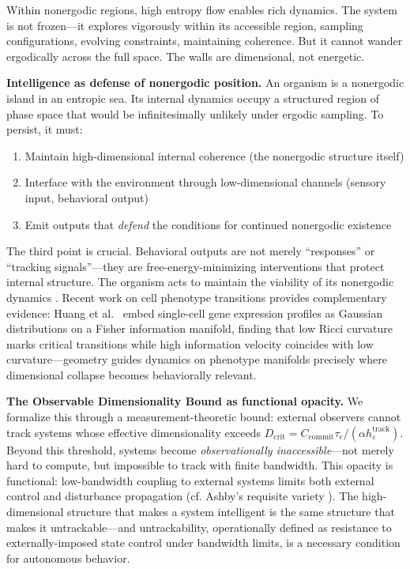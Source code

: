 \documentclass[12pt]{article}
\begin{document}
Within nonergodic regions, high entropy flow enables rich dynamics. The system is not frozen---it explores vigorously within its accessible region, sampling configurations, evolving constraints, maintaining coherence. But it cannot wander ergodically across the full space. The walls are dimensional, not energetic.

\textbf{Intelligence as defense of nonergodic position.} An organism is a nonergodic island in an entropic sea. Its internal dynamics occupy a structured region of phase space that would be infinitesimally unlikely under ergodic sampling. To persist, it must:
\begin{enumerate}
\item Maintain high-dimensional internal coherence (the nonergodic structure itself)
\item Interface with the environment through low-dimensional channels (sensory input, behavioral output)
\item Emit outputs that \textit{defend} the conditions for continued nonergodic existence
\end{enumerate}

The third point is crucial. Behavioral outputs are not merely ``responses'' or ``tracking signals''---they are free-energy-minimizing interventions that protect internal structure. The organism acts to maintain the viability of its nonergodic dynamics \cite{friston2010}. Recent work on cell phenotype transitions provides complementary evidence: Huang et al.~\cite{huang2024scim} embed single-cell gene expression profiles as Gaussian distributions on a Fisher information manifold, finding that low Ricci curvature marks critical transitions while high information velocity coincides with low curvature---geometry guides dynamics on phenotype manifolds precisely where dimensional collapse becomes behaviorally relevant.

\textbf{The Observable Dimensionality Bound as functional opacity.} We formalize this through a measurement-theoretic bound: external observers cannot track systems whose effective dimensionality exceeds $D_{\text{crit}} = C_{\text{commit}}\tau_e/(\alpha h_\varepsilon^{\text{track}})$. Beyond this threshold, systems become \textit{observationally inaccessible}---not merely hard to compute, but impossible to track with finite bandwidth. This opacity is functional: low-bandwidth coupling to external systems limits both external control and disturbance propagation (cf. Ashby's requisite variety \cite{ashby1956}). The high-dimensional structure that makes a system intelligent is the same structure that makes it untrackable---and untrackability, operationally defined as resistance to externally-imposed state control under bandwidth limits, is a necessary condition for autonomous behavior.
\end{document}
